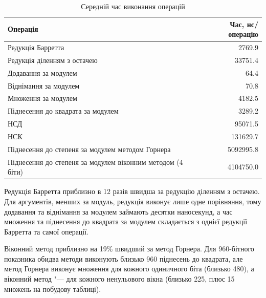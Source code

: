 \documentclass[11pt]{article}
\begin{document}
\begin{table}[htbp]
    \centering
    \begin{tabular}{|l|r|}
        \hline
        \textbf{Операція} & \textbf{Час, нс/операцію} \\
        \hline
        Редукція Барретта & 2769.9 \\
        Редукція діленням з остачею & 33751.4 \\
        Додавання за модулем & 64.4 \\
        Віднімання за модулем & 70.8 \\
        Множення за модулем & 4182.5 \\
        Піднесення до квадрата за модулем & 3289.2 \\
        НСД & 95071.5 \\
        НСК & 131629.7 \\
        Піднесення до степеня за модулем методом Горнера & 5092995.8 \\
        Піднесення до степеня за модулем віконним методом (4 біти) & 4104750.0 \\
        \hline
    \end{tabular}
    \caption{Середній час виконання операцій}
    \label{tab:benchmarks}
\end{table}

Редукція Барретта приблизно в 12 разів швидша
за редукцію діленням з остачею.
Для аргументів, менших за модуль, редукція виконує лише одне порівняння, тому
додавання та віднімання за модулем займають десятки наносекунд, а час множення
та піднесення до квадрата за модулем складається з однієї редукції Барретта
та самої операції.

Віконний метод приблизно на 19\% швидший за метод Горнера.
Для 960-бітного показника обидва методи виконують близько 960 піднесень до квадрата,
але метод Горнера виконує множення для кожного одиничного біта (близько 480),
а віконний метод "--- для кожного ненульового вікна (близько 225, плюс 15 множень
на побудову таблиці).
\end{document}
